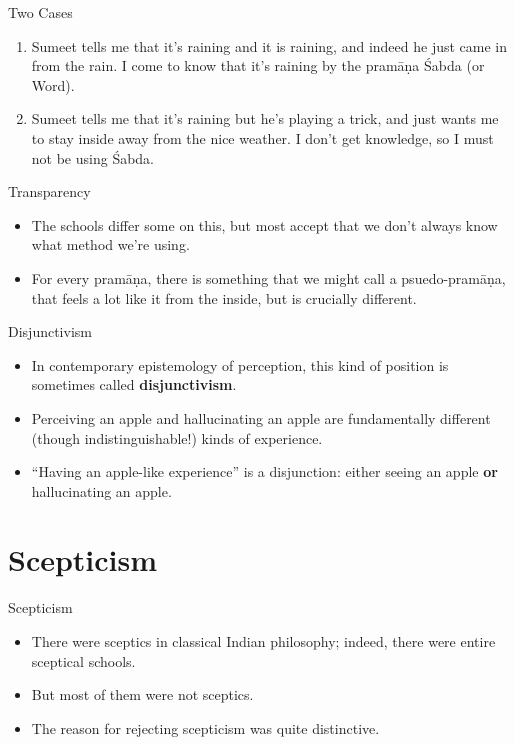 \documentclass[
  17pt,
  letterpaper,
  ignorenonframetext,
  aspectratio=169,
]{beamer}
\providecommand{\tightlist}{%
  \setlength{\itemsep}{0pt}\setlength{\parskip}{0pt}}\usepackage{longtable,booktabs,array}
\begin{document}
\begin{frame}{Two Cases}
\protect\hypertarget{two-cases}{}
\begin{enumerate}[<+->]
\tightlist
\item
  Sumeet tells me that it's raining and it is raining, and indeed he
  just came in from the rain. I come to know that it's raining by the
  pramāṇa Śabda (or Word).
\item
  Sumeet tells me that it's raining but he's playing a trick, and just
  wants me to stay inside away from the nice weather. I don't get
  knowledge, so I must not be using Śabda.
\end{enumerate}
\end{frame}

\begin{frame}{Transparency}
\protect\hypertarget{transparency}{}
\begin{itemize}[<+->]
\tightlist
\item
  The schools differ some on this, but most accept that we don't always
  know what method we're using.
\item
  For every pramāṇa, there is something that we might call a
  psuedo-pramāṇa, that feels a lot like it from the inside, but is
  crucially different.
\end{itemize}
\end{frame}

\begin{frame}{Disjunctivism}
\protect\hypertarget{disjunctivism}{}
\begin{itemize}[<+->]
\tightlist
\item
  In contemporary epistemology of perception, this kind of position is
  sometimes called \textbf{disjunctivism}.
\item
  Perceiving an apple and hallucinating an apple are fundamentally
  different (though indistinguishable!) kinds of experience.
\item
  ``Having an apple-like experience'' is a disjunction: either seeing an
  apple \textbf{or} hallucinating an apple.
\end{itemize}
\end{frame}

\hypertarget{scepticism}{%
\section{Scepticism}\label{scepticism}}

\begin{frame}{Scepticism}
\protect\hypertarget{scepticism-1}{}
\begin{itemize}[<+->]
\tightlist
\item
  There were sceptics in classical Indian philosophy; indeed, there were
  entire sceptical schools.
\item
  But most of them were not sceptics.
\item
  The reason for rejecting scepticism was quite distinctive.
\end{itemize}
\end{frame}
\end{document}
